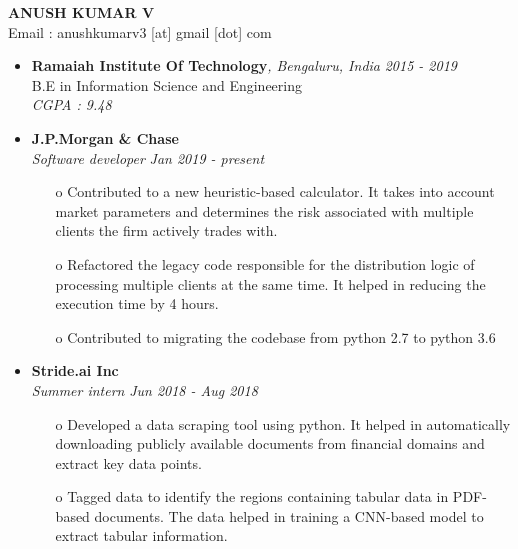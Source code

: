 \documentclass[11pt,a4paper]{article}
\begin{document}
\begin{center}
    \textbf{\huge ANUSH KUMAR V}
    \\ Email : anushkumarv3 [at] gmail [dot] com
\end{center}

\colorbox{gray}{}
    \begin{itemize}
    \item \textbf{Ramaiah Institute Of Technology}\emph{, Bengaluru, India} \hfill \textit{2015 - 2019}
    \\ B.E in Information Science and Engineering
    \\ \emph{CGPA : 9.48}
\end{itemize}

{
\colorbox{gray}{}

  \begin{itemize}
      \item \textbf{J.P.Morgan \& Chase}
      \\ \emph{Software developer} \hfill \textit{Jan 2019 - present}  
      \begin{itemize}
          \item[o] Contributed to a new heuristic-based calculator. It takes into account market parameters and determines the risk associated with multiple clients the firm actively trades with.
          \item[o] Refactored the legacy code responsible for the distribution logic of processing multiple clients at the same time. It helped in reducing the execution time by 4 hours.
          \item[o] Contributed to migrating the codebase from python 2.7 to python 3.6
      \end{itemize}
      \item \textbf{Stride.ai Inc}
      \\ \emph{Summer intern} \hfill \textit{Jun 2018 - Aug 2018}    
      \begin{itemize}
          \item[o] Developed a data scraping tool using python. It helped in automatically downloading publicly available documents from financial domains and extract key data points.
          \item[o] Tagged data to identify the regions containing tabular data in PDF-based documents. The data helped in training a CNN-based model to extract tabular information. 
      \end{itemize}
  \end{itemize}
}
\end{document}
